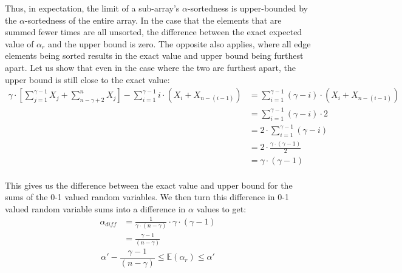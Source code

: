\documentclass{article}
\begin{document}
Thus, in expectation, the limit of a sub-array's $\alpha$-sortedness is upper-bounded by the $\alpha$-sortedness of the entire array.
In the case that the elements that are summed fewer times are all unsorted, the difference between the exact expected value of $\alpha_{r}$ and the upper bound is zero.
The opposite also applies, where all edge elements being sorted results in the exact value and upper bound being furthest apart.
 Let us show that even in the case where the two are furthest apart, the upper bound is still close to the exact value:
\begin{align*}
\gamma \cdot \left[ \sum_{j = 1}^{\gamma - 1} X_{j} + \sum_{n - \gamma + 2}^{n} X_{j}  \right] - \sum_{i=1}^{\gamma-1}i\cdot\left(X_{i} + X_{n-(i-1)}\right) &= \sum_{i=1}^{\gamma-1}\left(\gamma-i\right)\cdot\left(X_{i} + X_{n-(i-1)}\right) \\
&= \sum_{i=1}^{\gamma-1}\left(\gamma-i\right)\cdot 2 \\
&= 2 \cdot \sum_{i=1}^{\gamma-1}\left(\gamma-i\right) \\
&= 2 \cdot \frac{\gamma \cdot (\gamma - 1)}{2} \\
&= \gamma \cdot (\gamma - 1)
\end{align*}
\paragraph{}This gives us the difference between the exact value and upper bound for the sums of the 0-1 valued random variables.
 We then turn this difference in 0-1 valued random variable sums into a difference in $\alpha$ values to get:
\begin{align*}
\alpha_{diff} &= \frac{1}{\gamma \cdot (n - \gamma)} \cdot \gamma \cdot (\gamma - 1) \\
&= \frac{\gamma - 1}{(n - \gamma)}
\end{align*}
\begin{equation*}
\alpha' - \frac{\gamma - 1}{(n - \gamma)} \leq \mathbb E(\alpha_{r}) \leq \alpha'
\end{equation*}
\end{document}
